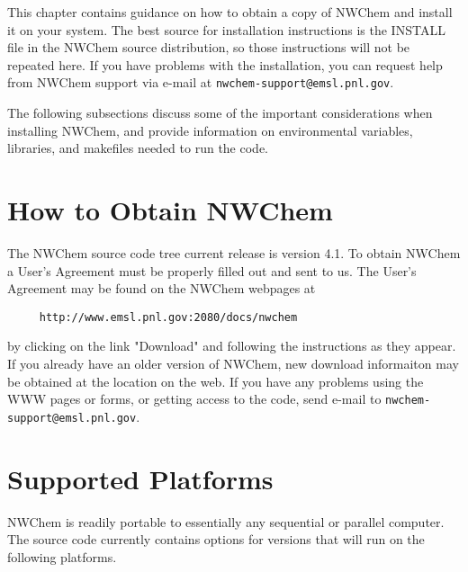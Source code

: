 \label{sec:install}

This chapter contains guidance on how to obtain a copy of NWChem and
install it on your system.   The best source for installation instructions
is the INSTALL file in the NWChem source distribution, so those
instructions will not be repeated here.  If you have problems with the
installation, you can request help from NWChem 
support via e-mail at {\tt nwchem-support@emsl.pnl.gov}.

The following subsections discuss some of the important considerations
when installing NWChem, and provide information on environmental
variables, libraries, and makefiles needed to run the code.

\section{How to Obtain NWChem}

The NWChem source code tree current release is version 4.1.  To obtain NWChem
a User's Agreement must be properly filled out and sent to us.  The User's
Agreement may be found on the NWChem webpages at

\begin{verbatim}
     http://www.emsl.pnl.gov:2080/docs/nwchem
\end{verbatim}

by clicking on the link "Download" and following the
instructions as they appear.  If you already have an older version of NWChem,
new download informaiton may be obtained at the location on the web.
If you have any problems
using the WWW pages or forms, or getting access to the code, send e-mail to
{\tt nwchem-support@emsl.pnl.gov}.

\section{Supported Platforms}
\label{sec:platforms}
NWChem is readily portable to essentially any sequential or parallel computer.  
The source code currently contains options for versions that will run
on the following platforms.


